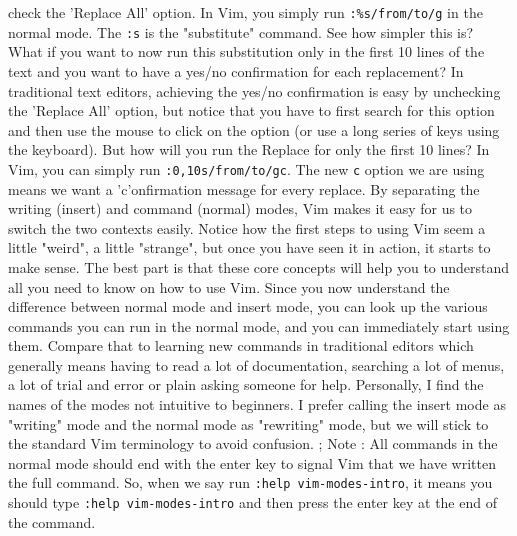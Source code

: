 check the 'Replace All' option. In Vim, you simply run \texttt{:\%s/from/to/g}
in the normal mode. The \texttt{:s} is the "substitute" command. See how
simpler this is? What if you want to now run this substitution only in the
first 10 lines of the text and you want to have a yes/no confirmation for each
replacement? In traditional text editors, achieving the yes/no confirmation is
easy by unchecking the 'Replace All' option, but notice that you have to first
search for this option and then use the mouse to click on the option (or use a
long series of keys using the keyboard). But how will you run the Replace for
only the first 10 lines? In Vim, you can simply run \texttt{:0,10s/from/to/gc}.
The new \texttt{c} option we are using means we want a 'c'onfirmation message
for every replace. By separating the writing (insert) and command (normal)
modes, Vim makes it easy for us to switch the two contexts easily. Notice how
the first steps to using Vim seem a little "weird", a little "strange", but
once you have seen it in action, it starts to make sense. The best part is that
these core concepts will help you to understand all you need to know on how to
use Vim. Since you now understand the difference between normal mode and insert
mode, you can look up the various commands you can run in the normal mode, and
you can immediately start using them. Compare that to learning new commands in
traditional editors which generally means having to read a lot of
documentation, searching a lot of menus, a lot of trial and error or plain
asking someone for help. Personally, I find the names of the modes not
intuitive to beginners. I prefer calling the insert mode as "writing" mode and
the normal mode as "rewriting" mode, but we will stick to the standard Vim
terminology to avoid confusion. ; Note : All commands in the normal mode should
end with the enter key to signal Vim that we have written the full command. So,
when we say run \texttt{:help vim-modes-intro}, it means you should type
\texttt{:help vim-modes-intro} and then press the enter key at the end of the
command. 

